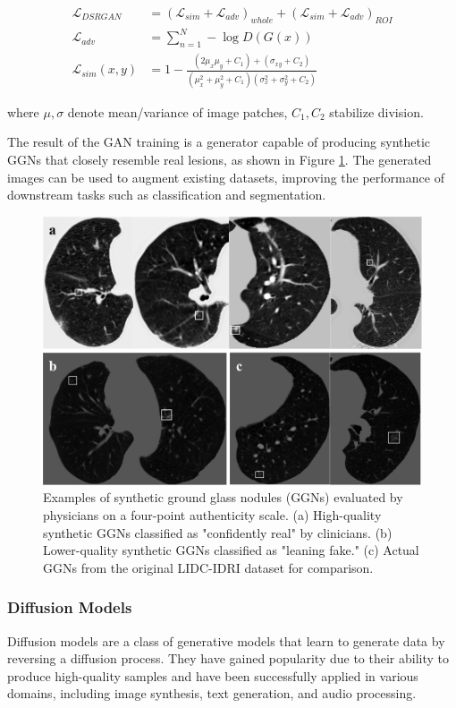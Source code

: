 \documentclass{article}
\begin{document}
\begin{align}
\mathcal{L}_{DSRGAN} &= (\mathcal{L}_{sim} + \mathcal{L}_{adv})_{whole} + (\mathcal{L}_{sim} + \mathcal{L}_{adv})_{ROI} \\
\mathcal{L}_{adv} &= \sum_{n=1}^N -\log D(G(x)) \\
\mathcal{L}_{sim}(x,y) &= 1 - \frac{(2\mu_x\mu_y + C_1) + (\sigma_{xy} + C_2)}{(\mu_x^2 + \mu_y^2 + C_1)(\sigma_x^2 + \sigma_y^2 + C_2)}
\end{align}

where $\mu,\sigma$ denote mean/variance of image patches, $C_1,C_2$ stabilize division.
    
The result of the GAN training is a generator capable of producing synthetic GGNs that closely resemble real lesions, as shown in Figure \ref{fig:gan_results}. The generated images can be used to augment existing datasets, improving the performance of downstream tasks such as classification and segmentation.

\begin{figure}[htb]
    \centering
    \includegraphics[width=0.98\linewidth]{images/gan_result.pdf}
    \caption{Examples of synthetic ground glass nodules (GGNs) evaluated by physicians on a four-point authenticity scale. (a) High-quality synthetic GGNs classified as "confidently real" by clinicians. (b) Lower-quality synthetic GGNs classified as "leaning fake." (c) Actual GGNs from the original LIDC-IDRI dataset for comparison.}
    \label{fig:gan_results}
\end{figure}

\subsubsection{Diffusion Models}
Diffusion models are a class of generative models that learn to generate data by reversing a diffusion process. They have gained popularity due to their ability to produce high-quality samples and have been successfully applied in various domains, including image synthesis, text generation, and audio processing\cite{songScoreBasedGenerativeModeling2021}.
\end{document}
